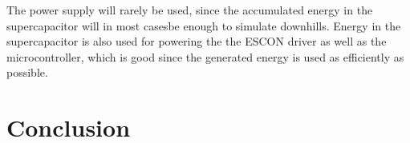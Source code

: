 The power supply will rarely be used, since the accumulated energy in the  supercapacitor will in most casesbe enough to simulate downhills. Energy in the supercapacitor is also used for powering the the ESCON driver as well as the microcontroller, which is good since the generated energy is used as efficiently as possible. 

\section{Conclusion}
